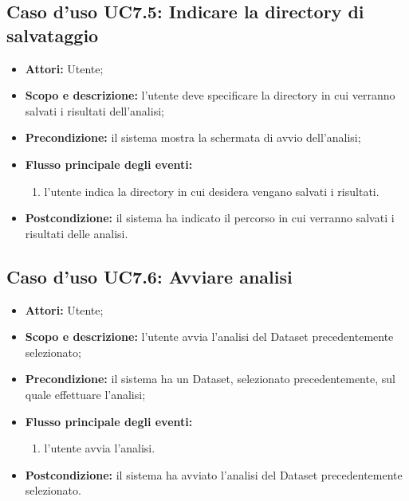 \subsection{Caso d'uso UC7.5: Indicare la directory di salvataggio}
\begin{itemize}
\item \textbf{Attori:} Utente;
\item \textbf{Scopo e descrizione:} l'utente deve specificare la directory in cui verranno salvati i risultati dell'analisi;
\item \textbf{Precondizione:} il sistema mostra la schermata di avvio dell'analisi;
\item \textbf{Flusso principale degli eventi:}
\begin{enumerate}
\item l'utente indica la directory in cui desidera vengano salvati i risultati.
\end{enumerate}
\item \textbf{Postcondizione:} il sistema ha indicato il percorso in cui verranno salvati i risultati delle analisi.
\end{itemize}

\subsection{Caso d'uso UC7.6: Avviare analisi}
\begin{itemize}
\item \textbf{Attori:} Utente;
\item \textbf{Scopo e descrizione:} l'utente avvia l'analisi del Dataset\glossario{} precedentemente selezionato;
\item \textbf{Precondizione:} il sistema ha un Dataset\glossario{}, selezionato precedentemente, sul quale effettuare l'analisi;
\item \textbf{Flusso principale degli eventi:}
\begin{enumerate}
\item l'utente avvia l'analisi.
\end{enumerate}
\item \textbf{Postcondizione:} il sistema ha avviato l'analisi del Dataset\glossario{} precedentemente selezionato.
\end{itemize}


